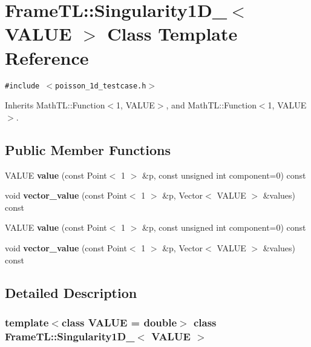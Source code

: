 \hypertarget{classFrameTL_1_1Singularity1D__2}{
\section{FrameTL::Singularity1D\_$<$ VALUE $>$ Class Template Reference}
\label{classFrameTL_1_1Singularity1D__2}
}
{\tt \#include $<$poisson\_\-1d\_\-testcase.h$>$}

Inherits MathTL::Function$<$1, VALUE$>$, and MathTL::Function$<$1, VALUE$>$.

\subsection*{Public Member Functions}
\begin{CompactItemize}
\item 
\hypertarget{classFrameTL_1_1Singularity1D__2_237ffe6850861b676d201535dcc188a9}{
VALUE \textbf{value} (const Point$<$ 1 $>$ \&p, const unsigned int component=0) const }
\label{classFrameTL_1_1Singularity1D__2_237ffe6850861b676d201535dcc188a9}

\item 
\hypertarget{classFrameTL_1_1Singularity1D__2_b3b29b6a43794f818d2765a68e32e79e}{
void \textbf{vector\_\-value} (const Point$<$ 1 $>$ \&p, Vector$<$ VALUE $>$ \&values) const }
\label{classFrameTL_1_1Singularity1D__2_b3b29b6a43794f818d2765a68e32e79e}

\item 
\hypertarget{classFrameTL_1_1Singularity1D__2_237ffe6850861b676d201535dcc188a9}{
VALUE \textbf{value} (const Point$<$ 1 $>$ \&p, const unsigned int component=0) const }
\label{classFrameTL_1_1Singularity1D__2_237ffe6850861b676d201535dcc188a9}

\item 
\hypertarget{classFrameTL_1_1Singularity1D__2_b3b29b6a43794f818d2765a68e32e79e}{
void \textbf{vector\_\-value} (const Point$<$ 1 $>$ \&p, Vector$<$ VALUE $>$ \&values) const }
\label{classFrameTL_1_1Singularity1D__2_b3b29b6a43794f818d2765a68e32e79e}

\end{CompactItemize}


\subsection{Detailed Description}
\subsubsection*{template$<$class VALUE = double$>$ class FrameTL::Singularity1D\_$<$ VALUE $>$}

